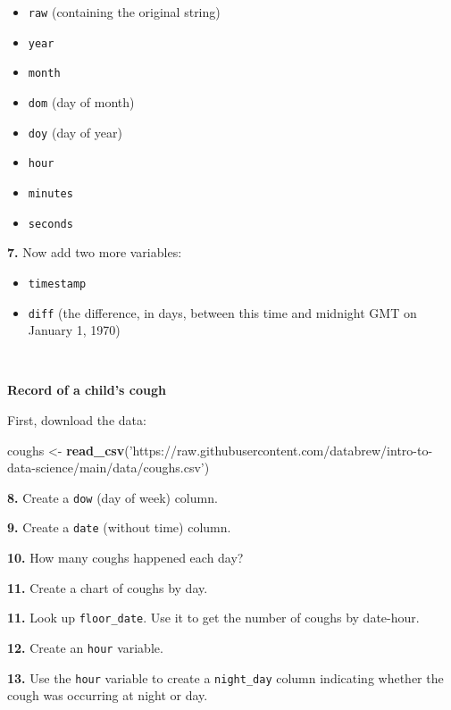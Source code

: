 \documentclass[]{book}
\newenvironment{Shaded}{\begin{snugshade}}{\end{snugshade}}
\newcommand{\KeywordTok}[1]{\textcolor[rgb]{0.13,0.29,0.53}{\textbf{#1}}}
\newcommand{\NormalTok}[1]{#1}
\newcommand{\StringTok}[1]{\textcolor[rgb]{0.31,0.60,0.02}{#1}}
\providecommand{\tightlist}{%
  \setlength{\itemsep}{0pt}\setlength{\parskip}{0pt}}
\begin{document}
\begin{itemize}
\tightlist
\item
  \texttt{raw} (containing the original string)\\
\item
  \texttt{year}
\item
  \texttt{month}
\item
  \texttt{dom} (day of month)
\item
  \texttt{doy} (day of year)
\item
  \texttt{hour}
\item
  \texttt{minutes}
\item
  \texttt{seconds}
\end{itemize}

\textbf{7.} Now add two more variables:

\begin{itemize}
\tightlist
\item
  \texttt{timestamp}~\\
\item
  \texttt{diff} (the difference, in days, between this time and midnight GMT on January 1, 1970)
\end{itemize}

~

\textbf{Record of a child's cough}

First, download the data:

\begin{Shaded}
\begin{Highlighting}[]
\NormalTok{coughs <-}\StringTok{ }\KeywordTok{read_csv}\NormalTok{(}\StringTok{'https://raw.githubusercontent.com/databrew/intro-to-data-science/main/data/coughs.csv'}\NormalTok{)}
\end{Highlighting}
\end{Shaded}

\textbf{8.} Create a \texttt{dow} (day of week) column.

\textbf{9.} Create a \texttt{date} (without time) column.

\textbf{10.} How many coughs happened each day?

\textbf{11.} Create a chart of coughs by day.

\textbf{11.} Look up \texttt{floor\_date}. Use it to get the number of coughs by date-hour.

\textbf{12.} Create an \texttt{hour} variable.

\textbf{13.} Use the \texttt{hour} variable to create a \texttt{night\_day} column indicating whether the cough was occurring at night or day.
\end{document}
